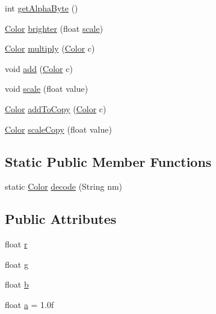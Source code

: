 \begin{DoxyCompactItemize}
\item 
int \mbox{\hyperlink{classorg_1_1newdawn_1_1slick_1_1_color_a7ee660333e53bf7fdad0afd82c0628cc}{get\+Alpha\+Byte}} ()
\item 
\mbox{\hyperlink{classorg_1_1newdawn_1_1slick_1_1_color}{Color}} \mbox{\hyperlink{classorg_1_1newdawn_1_1slick_1_1_color_afc7daa29584ce95c62f5db94237b5239}{brighter}} (float \mbox{\hyperlink{classorg_1_1newdawn_1_1slick_1_1_color_a53597f62e247b2193191c3c2a9828fa1}{scale}})
\item 
\mbox{\hyperlink{classorg_1_1newdawn_1_1slick_1_1_color}{Color}} \mbox{\hyperlink{classorg_1_1newdawn_1_1slick_1_1_color_a7531e1b247c0d75639790cbb84867a39}{multiply}} (\mbox{\hyperlink{classorg_1_1newdawn_1_1slick_1_1_color}{Color}} c)
\item 
void \mbox{\hyperlink{classorg_1_1newdawn_1_1slick_1_1_color_a1f9006bea9f8b5f69d6c494cbf4d84cb}{add}} (\mbox{\hyperlink{classorg_1_1newdawn_1_1slick_1_1_color}{Color}} c)
\item 
void \mbox{\hyperlink{classorg_1_1newdawn_1_1slick_1_1_color_a53597f62e247b2193191c3c2a9828fa1}{scale}} (float value)
\item 
\mbox{\hyperlink{classorg_1_1newdawn_1_1slick_1_1_color}{Color}} \mbox{\hyperlink{classorg_1_1newdawn_1_1slick_1_1_color_a07a98aec99eddcfa41401f412a93b526}{add\+To\+Copy}} (\mbox{\hyperlink{classorg_1_1newdawn_1_1slick_1_1_color}{Color}} c)
\item 
\mbox{\hyperlink{classorg_1_1newdawn_1_1slick_1_1_color}{Color}} \mbox{\hyperlink{classorg_1_1newdawn_1_1slick_1_1_color_aeb251c89cb3901649462a0c9bb03b661}{scale\+Copy}} (float value)
\end{DoxyCompactItemize}
\subsection*{Static Public Member Functions}
\begin{DoxyCompactItemize}
\item 
static \mbox{\hyperlink{classorg_1_1newdawn_1_1slick_1_1_color}{Color}} \mbox{\hyperlink{classorg_1_1newdawn_1_1slick_1_1_color_aaaab7a1210006aa8dd51479a056d4cda}{decode}} (String nm)
\end{DoxyCompactItemize}
\subsection*{Public Attributes}
\begin{DoxyCompactItemize}
\item 
float \mbox{\hyperlink{classorg_1_1newdawn_1_1slick_1_1_color_ac07fa95108064b044dcf9a53e95dcb48}{r}}
\item 
float \mbox{\hyperlink{classorg_1_1newdawn_1_1slick_1_1_color_aa6ebff7c102a1476e7b511a78397b753}{g}}
\item 
float \mbox{\hyperlink{classorg_1_1newdawn_1_1slick_1_1_color_a8c0cef152e16438fee852a97e50ef7a5}{b}}
\item 
float \mbox{\hyperlink{classorg_1_1newdawn_1_1slick_1_1_color_ab9288c822ff7614a77c887eb8c2595a7}{a}} = 1.\+0f
\end{DoxyCompactItemize}
